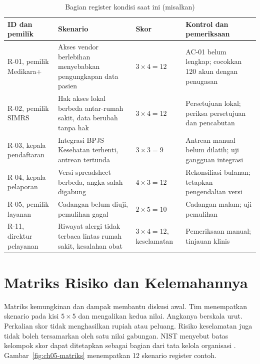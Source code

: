 \begin{table}[!htb]
  \centering\small
  \caption{Bagian register kondisi saat ini (misalkan)}\label{tab:ch05-register}
  \begin{tabularx}{\textwidth}{|>{\raggedright\arraybackslash}p{}|>{\raggedright\arraybackslash}X|>{\raggedright\arraybackslash}p{}|>{\raggedright\arraybackslash}X|}
    \hline
    \textbf{ID dan pemilik} & \textbf{Skenario} & \textbf{Skor} & \textbf{Kontrol dan pemeriksaan} \\
    \hline
    R-01, pemilik Medikara+ & Akses vendor berlebihan menyebabkan pengungkapan data pasien & $3 \times
    4 = 12$ & AC-01 belum lengkap; cocokkan 120 akun dengan penugasan \\ \hline
    R-02, pemilik SIMRS & Hak akses lokal berbeda antar-rumah sakit, data berubah tanpa hak & $3 \times
    4 = 12$ & Persetujuan lokal; periksa persetujuan dan pencabutan \\ \hline
    R-03, kepala pendaftaran & Integrasi BPJS Kesehatan terhenti, antrean tertunda & $3 \times 3 = 9$ &
    Antrean manual belum dilatih; uji gangguan integrasi \\ \hline
    R-04, kepala pelaporan & Versi spreadsheet berbeda, angka salah digabung & $4 \times 3 = 12$ &
    Rekonsiliasi bulanan; tetapkan pengendalian versi \\ \hline
    R-05, pemilik layanan & Cadangan belum diuji, pemulihan gagal & $2 \times 5 = 10$ & Cadangan malam;
    uji pemulihan \\ \hline
    R-11, direktur pelayanan & Riwayat alergi tidak terbaca lintas rumah sakit, kesalahan obat & $3
    \times 4 = 12$, keselamatan & Pemeriksaan manual; tinjauan klinis \\ \hline
  \end{tabularx}
\end{table}

\section{Matriks Risiko dan Kelemahannya}

Matriks kemungkinan dan dampak membantu diskusi awal. Tim menempatkan skenario pada kisi $5 \times 5$
dan mengalikan kedua nilai. Angkanya berskala urut. Perkalian skor tidak menghasilkan rupiah atau
peluang. Risiko keselamatan juga tidak boleh tersamarkan oleh satu nilai gabungan. NIST menyebut
batas kelompok skor dapat ditetapkan sebagai bagian dari tata kelola organisasi
\cite{c05-nist-ir8286r1}. Gambar~\ref{fig:ch05-matriks} menempatkan 12 skenario register contoh.

